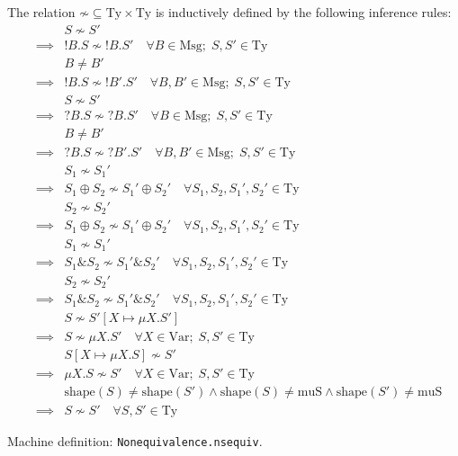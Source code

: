 \documentclass{llncs}
\newcommand*{\Msg}{\mathrm{Msg}}
\newcommand*{\Var}{\mathrm{Var}}
\newcommand*{\Ty}{\mathrm{Ty}}
\newcommand*{\shape}{\mathrm{shape}}
\newcommand*{\muS}{\mathrm{muS}}
\newcommand*{\nsequiv}{\not\sim}
\newcommand*{\send}{\mathord{!}}
\newcommand*{\recv}{\mathord{?}}
\newcommand*{\echoice}{\oplus}
\newcommand*{\ichoice}{\mathop{\&}}
\renewcommand*{\|}{\;|\;}
\newcommand*{\machdefc}[1]{Machine definition: \code{#1}.}
\newcommand*{\code}[1]{\texttt{#1}}
\begin{document}
\begin{definition}
  \label{def:nsequiv}
  The relation $\nsequiv \subseteq \Ty \times \Ty$ is inductively defined
  by the following inference rules:
  \begin{eqnarray*}
    && S \nsequiv S' \\
      &\implies& \send B.S \nsequiv \send B.S'
      \quad \forall B \in \Msg;\; S,S' \in \Ty \\
    && B \neq B' \\
      &\implies& \send B.S \nsequiv \send B'.S'
      \quad \forall B,B' \in \Msg;\; S,S' \in \Ty \\
    && S \nsequiv S' \\
      &\implies& \recv B.S \nsequiv \recv B.S'
      \quad \forall B \in \Msg;\; S,S' \in \Ty \\
    &&B \neq B' \\
      &\implies& \recv B.S \nsequiv \recv B'.S'
      \quad \forall B,B' \in \Msg;\; S,S' \in \Ty \\
    && S_1 \nsequiv S_1' \\
      &\implies& S_1 \echoice S_2 \nsequiv S_1' \echoice S_2'
      \quad \forall S_1,S_2,S_1',S_2' \in \Ty \\
    && S_2 \nsequiv S_2' \\
      &\implies& S_1 \echoice S_2 \nsequiv S_1' \echoice S_2'
      \quad \forall S_1,S_2,S_1',S_2' \in \Ty \\
    && S_1 \nsequiv S_1' \\
      &\implies& S_1 \ichoice S_2 \nsequiv S_1' \ichoice S_2'
      \quad \forall S_1,S_2,S_1',S_2' \in \Ty \\
    && S_2 \nsequiv S_2' \\
      &\implies& S_1 \ichoice S_2 \nsequiv S_1' \ichoice S_2'
      \quad \forall S_1,S_2,S_1',S_2' \in \Ty \\
    && S \nsequiv S'[X \mapsto \mu X.S'] \\
      &\implies& S \nsequiv \mu X.S'
      \quad \forall X \in \Var;\; S,S' \in \Ty \\
    && S[X \mapsto \mu X.S] \nsequiv S' \\
      &\implies& \mu X.S \nsequiv S'
      \quad \forall X \in \Var;\; S,S' \in \Ty \\
    && \shape(S) \neq \shape(S') \land \shape(S) \neq \muS \land \shape(S') \neq \muS \\
      &\implies& S \nsequiv S'
      \quad \forall S,S' \in \Ty
  \end{eqnarray*}

  \machdefc{Nonequivalence.nsequiv}
\end{definition}
\end{document}
